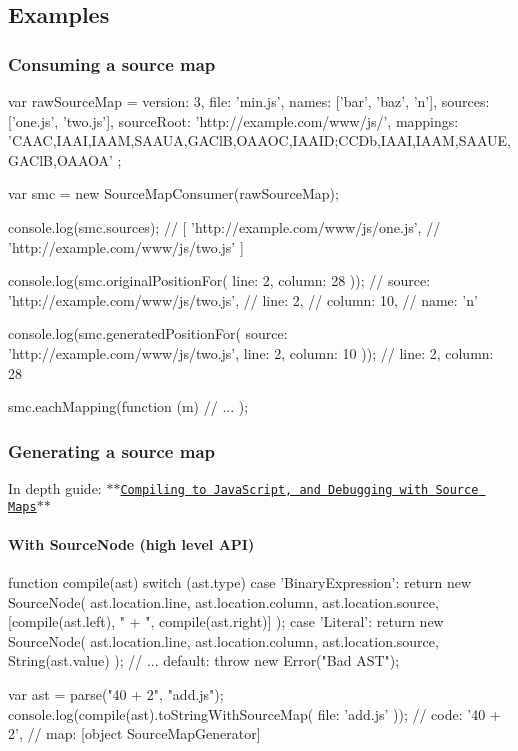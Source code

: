 \subsection*{Examples}

\subsubsection*{Consuming a source map}

\begin{DoxyVerb}var rawSourceMap = {
  version: 3,
  file: 'min.js',
  names: ['bar', 'baz', 'n'],
  sources: ['one.js', 'two.js'],
  sourceRoot: 'http://example.com/www/js/',
  mappings: 'CAAC,IAAI,IAAM,SAAUA,GAClB,OAAOC,IAAID;CCDb,IAAI,IAAM,SAAUE,GAClB,OAAOA'
};

var smc = new SourceMapConsumer(rawSourceMap);

console.log(smc.sources);
// [ 'http://example.com/www/js/one.js',
//   'http://example.com/www/js/two.js' ]

console.log(smc.originalPositionFor({
  line: 2,
  column: 28
}));
// { source: 'http://example.com/www/js/two.js',
//   line: 2,
//   column: 10,
//   name: 'n' }

console.log(smc.generatedPositionFor({
  source: 'http://example.com/www/js/two.js',
  line: 2,
  column: 10
}));
// { line: 2, column: 28 }

smc.eachMapping(function (m) {
  // ...
});
\end{DoxyVerb}


\subsubsection*{Generating a source map}

In depth guide\+: \href{https://hacks.mozilla.org/2013/05/compiling-to-javascript-and-debugging-with-source-maps/}{\tt $\ast$$\ast$\+Compiling to Java\+Script, and Debugging with Source Maps$\ast$$\ast$}

\paragraph*{With Source\+Node (high level A\+P\+I)}

\begin{DoxyVerb}function compile(ast) {
  switch (ast.type) {
  case 'BinaryExpression':
    return new SourceNode(
      ast.location.line,
      ast.location.column,
      ast.location.source,
      [compile(ast.left), " + ", compile(ast.right)]
    );
  case 'Literal':
    return new SourceNode(
      ast.location.line,
      ast.location.column,
      ast.location.source,
      String(ast.value)
    );
  // ...
  default:
    throw new Error("Bad AST");
  }
}

var ast = parse("40 + 2", "add.js");
console.log(compile(ast).toStringWithSourceMap({
  file: 'add.js'
}));
// { code: '40 + 2',
//   map: [object SourceMapGenerator] }
\end{DoxyVerb}


